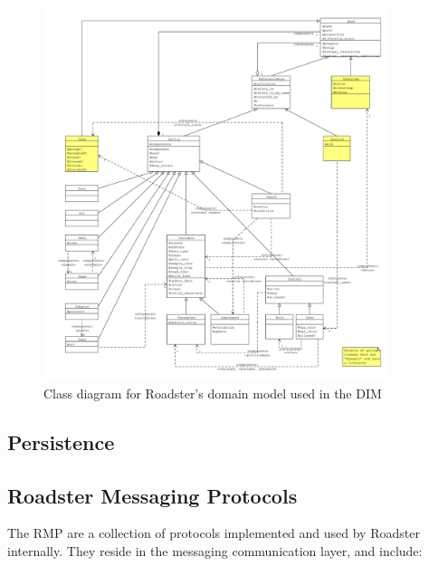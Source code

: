 \begin{figure}[]
	\includegraphics[trim=1.5cm 1cm 1cm 1cm, clip=true, width=0.9\textwidth]{img/meta_model.pdf}
	\caption{Class diagram for Roadster's domain model used in the DIM}
	\label{fig:roadster:meta-model}
\end{figure}

\subsection{Persistence}


\subsection{Roadster Messaging Protocols}\label{sec:rmp}
The \gls{RMP} are a collection of protocols implemented and used by Roadster
internally. They reside in the messaging communication layer, and include:

